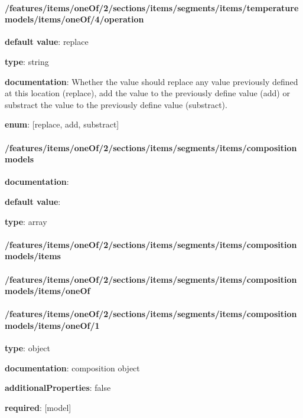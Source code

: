 \begin{itemized}
\end{itemized}\paragraph{/features/items/oneOf/2/sections/items/segments/items/temperature models/items/oneOf/4/operation} \begin{itemized}
\item {\bf default value}: replace
\item {\bf type}: string
\item {\bf documentation}: Whether the value should replace any value previously defined at this location (replace), add the value to the previously define value (add) or substract the value to the previously define value (substract).
\item {\bf enum}: [replace, add, substract]\end{itemized}\paragraph{/features/items/oneOf/2/sections/items/segments/items/composition models} \begin{itemized}
\item {\bf documentation}: 
\item {\bf default value}: 
\item {\bf type}: array
\paragraph{/features/items/oneOf/2/sections/items/segments/items/composition models/items} \begin{itemized}
\end{itemized}\end{itemized}\paragraph{/features/items/oneOf/2/sections/items/segments/items/composition models/items/oneOf} \begin{itemized}
\end{itemized}\paragraph{/features/items/oneOf/2/sections/items/segments/items/composition models/items/oneOf/1} \begin{itemized}
\item {\bf type}: object
\item {\bf documentation}: composition object
\item {\bf additionalProperties}: false
\item {\bf required}: [model]\end{itemized}
